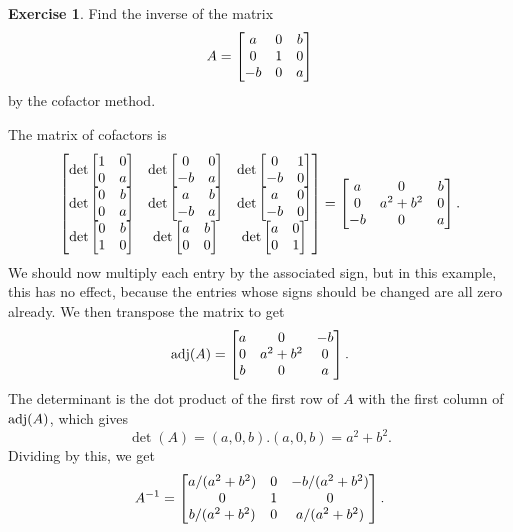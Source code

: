 \documentclass[a4paper]{book}
\theoremstyle{definition}
\newtheorem{exercise}[theorem]{Exercise}
\renewenvironment{solution}{\SolutionInline}{\endSolutionInline}
\begin{document}
\begin{exercise}
 Find the inverse of the matrix
 \[ A = \begin{bmatrix} a&0&b\\ 0&1&0\\ -b&0&a \end{bmatrix} \]
 by the cofactor method.
\end{exercise}
\begin{solution}
 The matrix of cofactors is
 \[ \begin{bmatrix} 
     \det\begin{bmatrix} 1&0\\  0&a\end{bmatrix} &
     \det\begin{bmatrix} 0&0\\ -b&a\end{bmatrix} &
     \det\begin{bmatrix} 0&1\\ -b&0\end{bmatrix} \\
     \det\begin{bmatrix} 0&b\\  0&a\end{bmatrix} &
     \det\begin{bmatrix} a&b\\ -b&a\end{bmatrix} &
     \det\begin{bmatrix} a&0\\ -b&0\end{bmatrix} \\
     \det\begin{bmatrix} 0&b\\  1&0\end{bmatrix} &
     \det\begin{bmatrix} a&b\\  0&0\end{bmatrix} &
     \det\begin{bmatrix} a&0\\  0&1\end{bmatrix} 
    \end{bmatrix} = 
    \begin{bmatrix} a & 0 & b \\
         0 & a^2+b^2 & 0 \\ 
         -b & 0 & a \end{bmatrix}.
 \]
 We should now multiply each entry by the associated sign, but in this
 example, this has no effect, because the entries whose signs should
 be changed are all zero already.  We then transpose the matrix to get 
 \[ \operatorname{adj}(A) = \begin{bmatrix} a&0&-b \\ 0&a^2+b^2&0 \\ b&0&a \end{bmatrix}. \]
 The determinant is the dot product of the first row of $A$ with the
 first column of $\operatorname{adj}(A)$, which gives
 \[ \det(A) = (a,0,b).(a,0,b) = a^2+b^2. \] 
 Dividing by this, we get
 \[ A^{-1} =
     \begin{bmatrix} a/(a^2+b^2) & 0 & -b/(a^2+b^2) \\
          0           & 1 &  0 \\ 
          b/(a^2+b^2) & 0 &  a/(a^2+b^2) \end{bmatrix}.
 \]
\end{solution}
\end{document}
